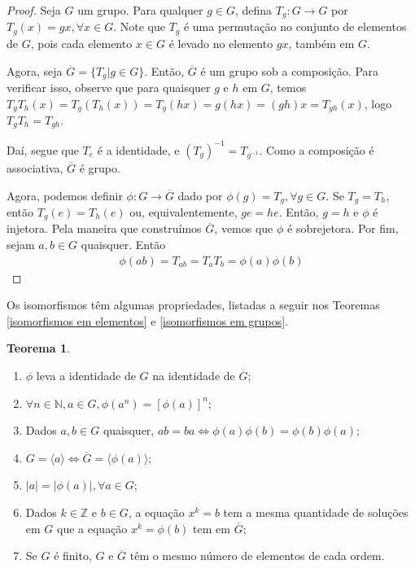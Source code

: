 \documentclass[a4paper,portuguese,11pt,twoside, leqno]{book}
\theoremstyle{definition}
\newtheorem{theorem}{Teorema}[section]
\begin{document}
	\begin{proof}
		Seja $G$ um grupo. Para qualquer $g\in G$, defina $T_g:G\to G$ por $T_g(x) = gx, \forall x\in G$. Note que $T_g$ é uma permutação no conjunto de elementos de $G$, pois cada elemento $x\in G$ é levado no elemento $gx$, também em $G$. 
		\par\vspace{0.3cm} Agora, seja $\overline{G} = \{ T_g | g\in G \}$. Então, $\overline{G}$ é um grupo sob a composição. Para verificar isso, observe que para quaisquer $g$ e $h$ em $G$, temos $T_gT_h(x) = T_g(T_h(x)) = T_g(hx) = g(hx) = (gh)x = T_{gh}(x)$, logo $T_gT_h = T_{gh}$.
		\par\vspace{0.3cm} Daí, segue que $T_e$ é a identidade, e $(T_g)^{-1} = T_{g^{-1}}$. Como a composição é associativa, $\overline{G}$ é grupo.
		\par\vspace{0.3cm} Agora, podemos definir $\phi: G\to\overline{G}$ dado por $\phi(g) = T_g, \forall g\in G$. Se $T_g = T_h$, então $T_g(e) = T_h(e)$ ou, equivalentemente, $ge = he$. Então, $g = h$ e $\phi$ é injetora. Pela maneira que construímos $\overline{G}$, vemos que $\phi$ é sobrejetora. Por fim, sejam $a,b\in G$ quaisquer. Então
		\begin{align*}
		\phi(ab) = T_{ab} = T_aT_b = \phi(a)\phi(b)
		\end{align*}
	\end{proof}
	\par\vspace{0.3cm} Os isomorfismos têm algumas propriedades, listadas a seguir nos Teoremas \eqref{isomorfismos em elementos} e \eqref{isomorfismos em grupos}.
	
	\begin{theorem}
		\label{isomorfismos em elementos}
		\begin{enumerate}
			\item \vspace{0.3cm} $\phi$ leva a identidade de $G$ na identidade de $\overline{G}$;
			\item $\forall n\in\mathbb{N}, a\in G, \phi (a^n) = [\phi (a)]^n$;
			\item Dados $a,b \in G$ quaisquer, $ab = ba \Leftrightarrow \phi (a)\phi (b) = \phi (b)\phi (a)$;
			\item $G = \langle a \rangle \Leftrightarrow \overline{G} = \langle\phi(a) \rangle$;
			\item $|a| = |\phi(a)|, \forall a\in G$;
			\item Dados $k\in\mathbb{Z}$ e $b\in G$, a equação $x^k = b$ tem a mesma quantidade de soluções em $G$ que a equação $x^k = \phi(b)$ tem em $\overline{G}$;
			\item Se $G$ é finito, $G$ e $\overline{G}$ têm o mesmo número de elementos de cada ordem. 
		\end{enumerate}
	\end{theorem}
	
\end{document}
